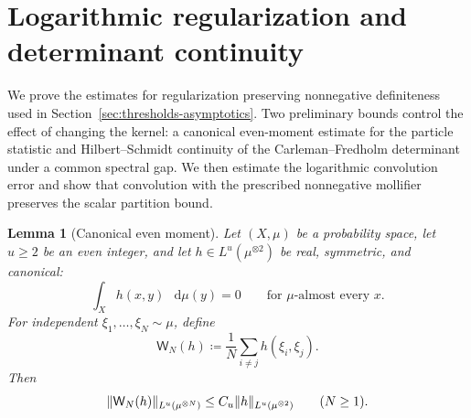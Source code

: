 \documentclass[11pt,reqno]{amsart}
\numberwithin{equation}{section}
\theoremstyle{plain}
\newtheorem{lemma}[lemma]{Lemma}
\theoremstyle{definition}
\DeclarePairedDelimiter{\norm}{\lVert}{\rVert}
\newcommand{\dd}{\mathop{}\!\mathrm d}
\begin{document}
\section{Logarithmic regularization and determinant continuity}
\label{app:homogeneous-regularization}

We prove the estimates for regularization preserving nonnegative definiteness used in Section~\ref{sec:thresholds-asymptotics}. Two preliminary bounds control the effect of changing the kernel: a canonical even-moment estimate for the particle statistic and Hilbert--Schmidt continuity of the Carleman--Fredholm determinant under a common spectral gap. We then estimate the logarithmic convolution error and show that convolution with the prescribed nonnegative mollifier preserves the scalar partition bound.

\begin{lemma}[Canonical even moment]
\label{lem:canonical-even-moment}
Let $(X,\mu)$ be a probability space, let $u\geq2$ be an even integer, and let $h\in L^u(\mu^{\otimes2})$ be real, symmetric, and canonical:
\begin{equation}
 \int_Xh(x,y)\,\dd\mu(y)=0
 \qquad\text{for }\mu\text{-almost every }x.
 \label{eq:canonical-even-moment-hypothesis}
\end{equation}
For independent $\xi_1,\ldots,\xi_N\sim\mu$, define
\begin{equation}
 \mathsf W_N(h)\coloneqq\frac1N\sum_{i\neq j}h(\xi_i,\xi_j).
 \label{eq:canonical-even-moment-statistic}
\end{equation}
Then
\begin{equation}
 \norm{\mathsf W_N(h)}_{L^u(\mu^{\otimes N})}
 \leq C_u\norm{h}_{L^u(\mu^{\otimes2})}
 \qquad(N\geq1).
 \label{eq:canonical-even-moment-conclusion}
\end{equation}
\end{lemma}
\end{document}
